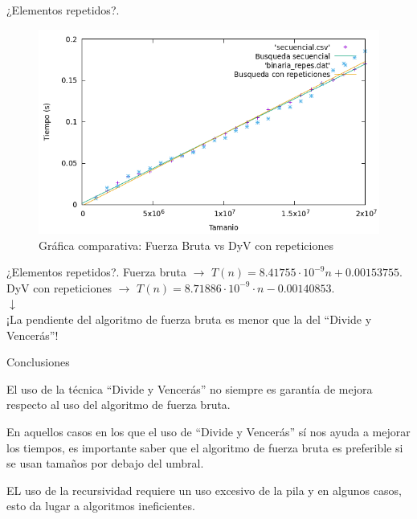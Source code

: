 \documentclass[10pt, xcolor=table]{beamer}
\begin{document}
\begin{frame}[fragile]{¿Elementos repetidos?. }
	\begin{figure}[h!]
		\centering
		\includegraphics[scale=0.45]{./Images/Grafica_secvsrep.png}
		\caption{Gráfica comparativa: Fuerza Bruta vs DyV con repeticiones}
	\end{figure}
\end{frame}

\begin{frame}[fragile]{¿Elementos repetidos?. }
	\centering Fuerza bruta $\longrightarrow$ \( T(n) = 8.41755 \cdot 10^{-9} n + 0.00153755\).\\
	
	\centering DyV con repeticiones $\longrightarrow$ \( T(n) = 8.71886 \cdot 10^{-9} \cdot n -0.00140853 \).\\
	
	\centering $\downarrow$ \\
	
	\centering ¡La pendiente del algoritmo de fuerza bruta es menor que la del ``Divide y Vencerás''!
\end{frame}

\begin{frame}{Conclusiones}
	
	\item El uso de la técnica ``Divide y Vencerás'' no siempre es garantía de mejora respecto al uso del algoritmo de fuerza bruta.
	
	\item En aquellos casos en los que el uso de ``Divide y Vencerás'' sí nos ayuda a mejorar los tiempos, es importante saber que el algoritmo de fuerza bruta es preferible si se usan tamaños por debajo del umbral.
	
	\item EL uso de la recursividad requiere un uso excesivo de la pila y en algunos casos, esto da lugar a algoritmos ineficientes.
	
\end{frame}
\end{document}
